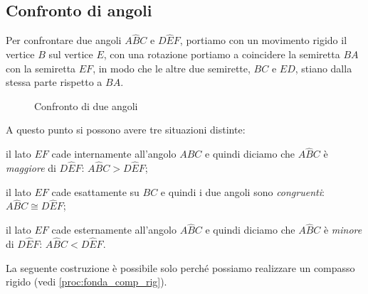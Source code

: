 \subsection{Confronto di angoli}

Per confrontare due angoli $A\widehat{B}C$ e $D\widehat{E}F$, 
portiamo con un movimento rigido il vertice $B$ sul vertice $E$, con 
una rotazione portiamo a coincidere la semiretta $BA$ con la 
semiretta $EF$, in modo che le altre due semirette, $BC$ e $ED$, 
stiano dalla stessa parte rispetto a $BA$.


\begin{inaccessibleblock}
 \begin{figure}[htb]
\centering
\caption{Confronto di due angoli}
\end{figure}
\end{inaccessibleblock}

A questo punto si possono avere tre situazioni distinte:
\begin{itemize*}
\item il lato $EF$ cade internamente all'angolo $A\widehat{B}C$ e 
quindi diciamo che $A\widehat{B}C$ è \emph{maggiore} di 
$D\widehat{E}F$: $A\widehat{B}C>D\widehat{E}F$;
\item il lato $EF$ cade esattamente su $BC$ e quindi i due angoli 
sono \emph{congruenti}: $A\widehat{B}C\cong D\widehat{E}F$;
\item il lato $EF$ cade esternamente all'angolo $A\widehat{B}C$ e 
quindi diciamo che $A\widehat{B}C$ è \emph{minore} di 
$D\widehat{E}F$: $A\widehat{B}C<D\widehat{E}F$.
\end{itemize*}

\begin{comment}
Puoi usare le seguenti righe per come schema da riempire ogni volta che vuoi 
descrivere una procedura
Le copi dove vuoi realizzare una procedura, aggiungi gli \item necessari, e ci 
copi dentro i pezzi di testo che hai già scritto.

Con riga e compasso.

\begin{procedura}[<nome della costruzione>]
 :
\begin{enumerate} [nosep]
\item 

\item 

\item 

\end{enumerate}
\end{procedura}

\ifcoding
Con la geometria interattiva.


\fi

\end{comment}
\begin{osservazione}
 La seguente costruzione è possibile solo perché possiamo realizzare un 
compasso rigido (vedi \ref{proc:fonda_comp_rig}).
\end{osservazione}

